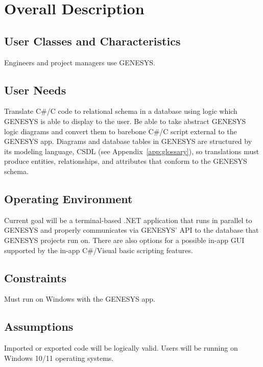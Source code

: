 \chapter{Overall Description}
\label{Overall Description}

\section{User Classes and Characteristics}

Engineers and project managers use GENESYS.


\section{User Needs}

Translate C\#/C code to relational schema in a database using logic which GENESYS is able to display to the user. Be able to take abstract GENESYS logic diagrams and convert them to barebone C\#/C script external to the GENESYS app. Diagrams and database tables in GENESYS are structured by its modeling language, CSDL (see Appendix~\ref{app:glossary}), so translations must produce entities, relationships, and attributes that conform to the GENESYS schema. 

\section{Operating Environment}

Current goal will be a terminal-based .NET application that runs in parallel to GENESYS and properly communicates via GENESYS' API to the database that GENESYS projects run on. There are also options for a possible in-app GUI supported by the in-app C\#/Visual basic scripting features. 

\section{Constraints}

Must run on Windows with the GENESYS app.

\section{Assumptions}

Imported or exported code will be logically valid. Users will be running on Windows 10/11 operating systems.

\newpage




